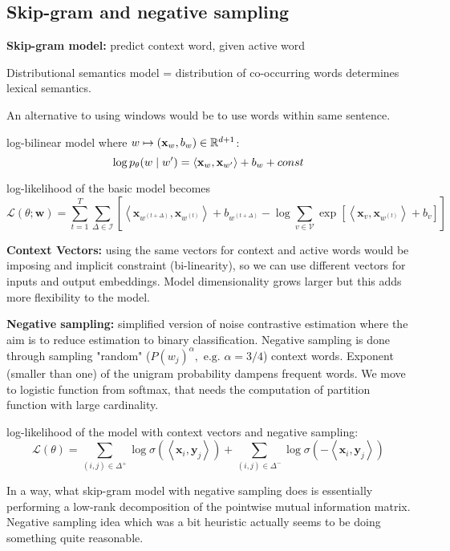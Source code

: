 \documentclass[12pt]{article}
\begin{document}
\subsection{Skip-gram and negative sampling}
\ulb
\item \textbf{Skip-gram model:} predict context word, given active word
\item Distributional semantics model = distribution of co-occurring words determines lexical semantics.
\item An alternative to using windows would be to use words within same sentence.
\item log-bilinear model where $w \mapsto (\mathbf{x}_w, b_w)\in\mathbb{R}^{d+1}$:
\[ \log p_{\theta}(w\mid w') = \left\langle \mathbf{x}_w, \mathbf{x}_{w'} \right\rangle + b_w + const \]
\item log-likelihood of the basic model becomes
\[ \mathcal{L}(\theta;\mathbf{w}) = \sum_{t=1}^T \sum_{\Delta\in\mathcal{I}} \left[
\left\langle \mathbf{x}_{w^{(t+\Delta)}}, \mathbf{x}_{w^{(t)}} \right\rangle + b_{w^{(t+\Delta)}}
-\log \sum_{v\in\mathcal{V}} \exp\left[ \left\langle \mathbf{x}_{v}, \mathbf{x}_{w^{(t)}} \right\rangle + b_{v} \right]
\right] \]
\item \textbf{Context Vectors:} using the same vectors for context and active words would be imposing and implicit constraint (bi-linearity), so we can use different vectors for inputs and output embeddings. Model dimensionality grows larger but this adds more flexibility to the model.
\item \textbf{Negative sampling:} simplified version of noise contrastive estimation where the aim is to reduce estimation to binary classification. Negative sampling is done through sampling "random" ($P(w_j)^{\alpha}, \text{ e.g. } \alpha=3/4$) context words. Exponent (smaller than one) of the unigram probability dampens frequent words. We move to logistic function from softmax, that needs the computation of partition function with large cardinality.
\item log-likelihood of the model with context vectors and negative sampling:
\[ \mathcal{L}(\theta) = \sum_{(i,j)\in\Delta^+} \log\sigma\left(\left\langle \mathbf{x}_i,\mathbf{y}_j \right\rangle\right) + \sum_{(i,j)\in\Delta^-} \log\sigma\left(-\left\langle \mathbf{x}_i,\mathbf{y}_j \right\rangle\right) \]
\item In a way, what skip-gram model with negative sampling does is essentially performing a low-rank decomposition of the pointwise mutual information matrix. Negative sampling idea which was a bit heuristic actually seems to be doing something quite reasonable.
\ule
\end{document}
